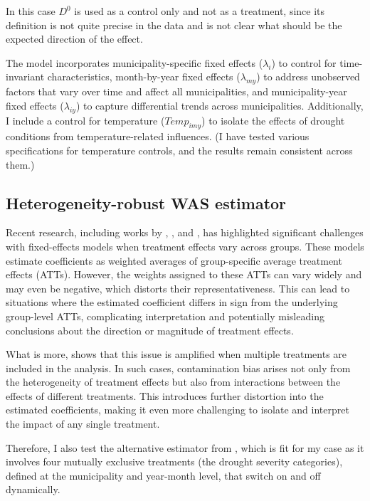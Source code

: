 \documentclass[12pt, oneside]{article}      %
\begin{document}
In this case $D^0$ is used as a control only and not as a treatment, since its definition is not quite precise in the data and is not clear what should be the expected direction of the effect.

The model incorporates municipality-specific fixed effects ($\lambda_i$) to control for time-invariant characteristics, month-by-year fixed effects ($\lambda_{my}$) to address unobserved factors that vary over time and affect all municipalities, and municipality-year fixed effects ($\lambda_{iy}$) to capture differential trends across municipalities. Additionally, I include a control for temperature ($Temp_{imy}$) to isolate the effects of drought conditions from temperature-related influences. (I have tested various specifications for temperature controls, and the results remain consistent across them.)

\subsection{Heterogeneity-robust WAS estimator}

Recent research, including works by \cite{GOODMANBACON2021254}, \cite{SUN2021175}, and \cite{deChaisemartin2020}, has highlighted significant challenges with fixed-effects models when treatment effects vary across groups. These models estimate coefficients as weighted averages of group-specific average treatment effects (ATTs). However, the weights assigned to these ATTs can vary widely and may even be negative, which distorts their representativeness. This can lead to situations where the estimated coefficient differs in sign from the underlying group-level ATTs, complicating interpretation and potentially misleading conclusions about the direction or magnitude of treatment effects.

What is more, \cite{deChaisemartin2023} shows that this issue is amplified when multiple treatments are included in the analysis. In such cases, contamination bias arises not only from the heterogeneity of treatment effects but also from interactions between the effects of different treatments. This introduces further distortion into the estimated coefficients, making it even more challenging to isolate and interpret the impact of any single treatment.

Therefore, I also test the alternative estimator from \cite{deChaisemartin2023}, which is fit for my case as it involves four mutually exclusive treatments (the drought severity categories), defined at the municipality and year-month level, that switch on and off dynamically.
\end{document}
